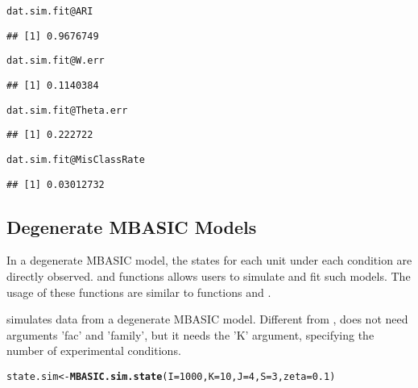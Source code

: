 \documentclass[a4paper,10pt]{article}\usepackage[]{graphicx}\usepackage[]{color}
\makeatletter
\newcommand{\hlnum}[1]{\textcolor[rgb]{0.686,0.059,0.569}{#1}}%
\newcommand{\hlopt}[1]{\textcolor[rgb]{0,0,0}{#1}}%
\newcommand{\hlstd}[1]{\textcolor[rgb]{0.345,0.345,0.345}{#1}}%
\newcommand{\hlkwb}[1]{\textcolor[rgb]{0.69,0.353,0.396}{#1}}%
\newcommand{\hlkwc}[1]{\textcolor[rgb]{0.333,0.667,0.333}{#1}}%
\newcommand{\hlkwd}[1]{\textcolor[rgb]{0.737,0.353,0.396}{\textbf{#1}}}%
\newenvironment{kframe}{%
 \def\at@end@of@kframe{}%
 \ifinner\ifhmode%
  \def\at@end@of@kframe{\end{minipage}}%
  \begin{minipage}{\columnwidth}%
 \fi\fi%
 \def\FrameCommand##1{\hskip\@totalleftmargin \hskip-\fboxsep
 \colorbox{shadecolor}{##1}\hskip-\fboxsep
     \hskip-\linewidth \hskip-\@totalleftmargin \hskip\columnwidth}%
 \MakeFramed {\advance\hsize-\width
   \@totalleftmargin\z@ \linewidth\hsize
   \@setminipage}}%
 {\par\unskip\endMakeFramed%
 \at@end@of@kframe}
\newenvironment{knitrout}{}{} %
\makeatother
\begin{document}
\begin{knitrout}
\color{fgcolor}\begin{kframe}
\begin{alltt}
\hlstd{dat.sim.fit}\hlopt{@}\hlkwc{ARI}
\end{alltt}
\begin{verbatim}
## [1] 0.9676749
\end{verbatim}
\begin{alltt}
\hlstd{dat.sim.fit}\hlopt{@}\hlkwc{W.err}
\end{alltt}
\begin{verbatim}
## [1] 0.1140384
\end{verbatim}
\begin{alltt}
\hlstd{dat.sim.fit}\hlopt{@}\hlkwc{Theta.err}
\end{alltt}
\begin{verbatim}
## [1] 0.222722
\end{verbatim}
\begin{alltt}
\hlstd{dat.sim.fit}\hlopt{@}\hlkwc{MisClassRate}
\end{alltt}
\begin{verbatim}
## [1] 0.03012732
\end{verbatim}
\end{kframe}
\end{knitrout}

\subsection{Degenerate MBASIC Models}

In a degenerate MBASIC model, the states for each unit under each condition are directly observed.  and  functions allows users to simulate and fit such models. The usage of these functions are similar to functions  and .

 simulates data from a degenerate MBASIC model. Different from ,  does not need arguments 'fac' and 'family', but it needs the 'K' argument, specifying the number of experimental conditions.

\begin{knitrout}
\color{fgcolor}\begin{kframe}
\begin{alltt}
\hlstd{state.sim} \hlkwb{<-} \hlkwd{MBASIC.sim.state}\hlstd{(}\hlkwc{I} \hlstd{=} \hlnum{1000}\hlstd{,} \hlkwc{K} \hlstd{=} \hlnum{10}\hlstd{,} \hlkwc{J} \hlstd{=} \hlnum{4}\hlstd{,} \hlkwc{S} \hlstd{=} \hlnum{3}\hlstd{,} \hlkwc{zeta} \hlstd{=} \hlnum{0.1}\hlstd{)}
\end{alltt}
\end{kframe}
\end{knitrout}
\end{document}
